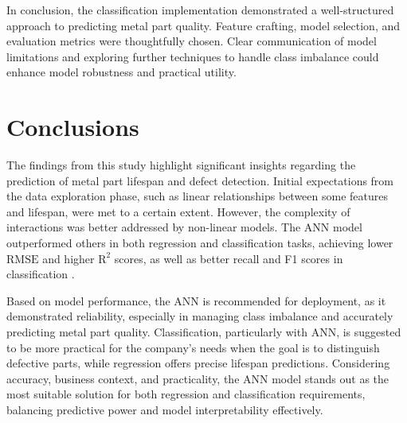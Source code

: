 \documentclass{article}
\begin{document}
In conclusion, the classification implementation demonstrated a well-structured approach to predicting metal part quality. Feature crafting, model selection, and evaluation metrics were thoughtfully chosen. Clear communication of model limitations and exploring further techniques to handle class imbalance could enhance model robustness and practical utility.

\section{Conclusions}

The findings from this study highlight significant insights regarding the prediction of metal part lifespan and defect detection. Initial expectations from the data exploration phase, such as linear relationships between some features and lifespan, were met to a certain extent. However, the complexity of interactions was better addressed by non-linear models. The ANN model outperformed others in both regression and classification tasks, achieving lower $\text{RMSE}$ and higher $\text{R}^2$ scores, as well as better recall and F1 scores in classification \parencite{jagtap2022activation, rajan2021regression}.

Based on model performance, the ANN is recommended for deployment, as it demonstrated reliability, especially in managing class imbalance and accurately predicting metal part quality. Classification, particularly with ANN, is suggested to be more practical for the company's needs when the goal is to distinguish defective parts, while regression offers precise lifespan predictions. Considering accuracy, business context, and practicality, the ANN model stands out as the most suitable solution for both regression and classification requirements, balancing predictive power and model interpretability effectively.

\printbibliography
\end{document}
